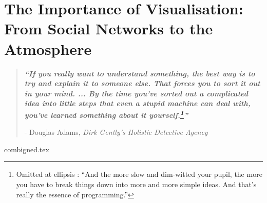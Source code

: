 


\chapter{ The Importance of Visualisation:  From Social Networks to the Atmosphere }\label{ch1}

\blankpage
\restoregeometry
\vspace*{0.15\paperheight}



\begin{center}
\begin{quotation}
  \large{\emph{\textbf{``If you really want to understand something, the best way is to try and explain it to someone else. That forces you to sort it out in your mind. ... By the time you’ve sorted out a complicated idea into little steps that even a stupid machine can deal with, you’ve learned something about it yourself.\footnote{ Omitted at ellipsis : ``And the more slow and dim-witted your pupil, the more you have to break things down into more and more simple ideas. And that’s really the essence of programming.''}''} }  }  \\
  \begin{flushright}
  - Douglas Adams, \textit{Dirk Gently's Holistic Detective Agency}
  \end{flushright}
 \end{quotation}
\end{center}
\doublespacing
\newpage

%




{combigned.tex} 

\chapterbib

